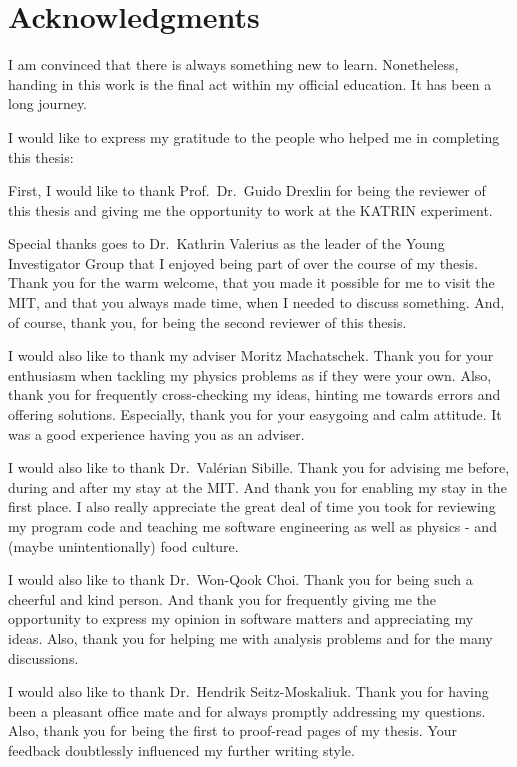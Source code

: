 \chapter*{Acknowledgments}
I am convinced that there is always something new to learn. Nonetheless, handing in this work is the final act within my official education. It has been a long journey. 

I would like to express my gratitude to the people who helped me in completing this thesis:

First, I would like to thank Prof.~Dr.~Guido Drexlin for being the reviewer of this thesis and giving me the opportunity to work at the KATRIN experiment.

Special thanks goes to Dr.~Kathrin Valerius as the leader of the Young Investigator Group that I enjoyed being part of over the course of my thesis. Thank you for the warm welcome, that you made it possible for me to visit the MIT, and that you always made time, when I needed to discuss something. And, of course, thank you, for being the second reviewer of this thesis. 

I would also like to thank my adviser Moritz Machatschek. Thank you for your enthusiasm when tackling my physics problems as if they were your own. Also, thank you for frequently cross-checking my ideas, hinting me towards errors and offering solutions. Especially, thank you for your easygoing and calm attitude. It was a good experience having you as an adviser.

I would also like to thank Dr.~Valérian Sibille. Thank you for advising me before, during and after my stay at the MIT. And thank you for enabling my stay in the first place. I also really appreciate the great deal of time you took for reviewing my program code and teaching me software engineering as well as physics - and (maybe unintentionally) food culture.

I would also like to thank Dr.~Won-Qook Choi. Thank you for being such a cheerful and kind person. And thank you for frequently giving me the opportunity to express my opinion in software matters and appreciating my ideas. Also, thank you for helping me with analysis problems and for the many discussions.


I would also like to thank Dr.~Hendrik Seitz-Moskaliuk. Thank you for having been a pleasant office mate and for always promptly addressing my questions. Also, thank you for being the first to proof-read pages of my thesis. Your feedback doubtlessly influenced my further writing style.

